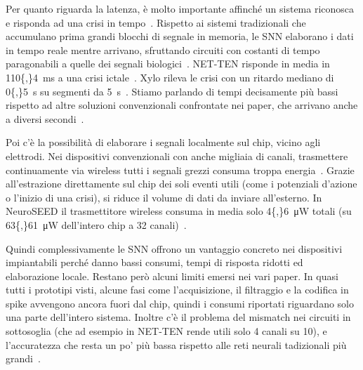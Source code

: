 Per quanto riguarda la latenza, è molto importante affinché un sistema riconosca e risponda ad una crisi in tempo~\cite{ronchini2023}. Rispetto ai sistemi tradizionali che accumulano prima grandi blocchi di segnale in memoria, le SNN elaborano i dati in tempo reale mentre arrivano, sfruttando circuiti con costanti di tempo paragonabili a quelle dei segnali biologici~\cite{ronchini2023, bartels2025, li2024}. NET-TEN risponde in media in \SI{110{,}4}{\milli\second} a una crisi ictale~\cite{ronchini2023}. Xylo rileva le crisi con un ritardo mediano di \SI{0{,}5}{\second} su segmenti da \SI{5}{\second}~\cite{li2024}. Stiamo parlando di tempi decisamente più bassi rispetto ad altre soluzioni convenzionali confrontate nei paper, che arrivano anche a diversi secondi~\cite{ronchini2023}.

Poi c'è la possibilità di elaborare i segnali localmente sul chip, vicino agli elettrodi. Nei dispositivi convenzionali con anche migliaia di canali, trasmettere continuamente via wireless tutti i segnali grezzi consuma troppa energia~\cite{ronchini2023, wu2026}. Grazie all'estrazione direttamente sul chip dei soli eventi utili (come i potenziali d'azione o l'inizio di una crisi), si riduce il volume di dati da inviare all'esterno. In NeuroSEED il trasmettitore wireless consuma in media solo \SI{4{,}6}{\micro\watt} totali (su \SI{63{,}61}{\micro\watt} dell'intero chip a 32 canali)~\cite{wu2026}.

Quindi complessivamente le SNN offrono un vantaggio concreto nei dispositivi impiantabili perché danno bassi consumi, tempi di risposta ridotti ed elaborazione locale. Restano però alcuni limiti emersi nei vari paper. In quasi tutti i prototipi visti, alcune fasi come l'acquisizione, il filtraggio e la codifica in spike avvengono ancora fuori dal chip, quindi i consumi riportati riguardano solo una parte dell'intero sistema. Inoltre c'è il problema del mismatch nei circuiti in sottosoglia (che ad esempio in NET-TEN rende utili solo 4 canali su 10), e l'accuratezza che resta un po' più bassa rispetto alle reti neurali tadizionali più grandi~\cite{ronchini2023, bartels2025, li2024, wu2026}.
